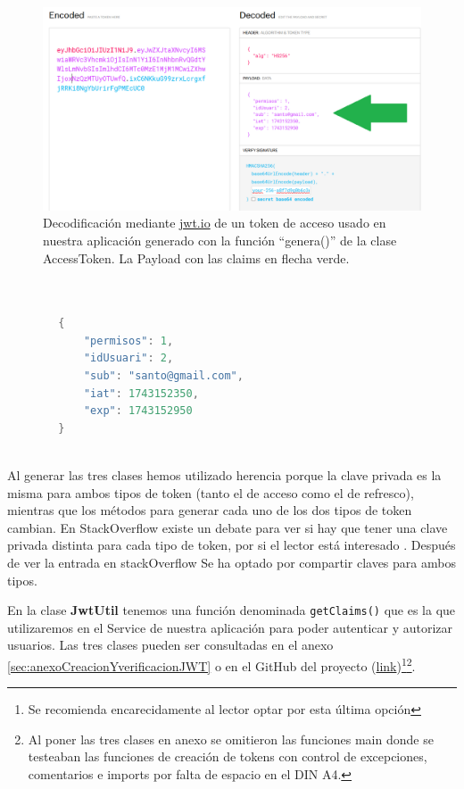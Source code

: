 \documentclass[a4paper,12pt]{report}
\begin{document}
	
			\setlength{\belowcaptionskip}{3pt}
			\FloatBarrier
			\begin{figure}[H]
				\centering
				\caption{Decodificación mediante \href{https://www.jwt.io}{jwt.io} de un token de acceso usado en nuestra aplicación generado con la función ``genera()'' de la clase AccessToken. La Payload con las claims en flecha verde.}
				\includegraphics[width=1\textwidth]{img/jwtio_mostra_payload.png}

				\label{fig:jwtioMostraPayload} 
			\end{figure}
			\FloatBarrier

		
\begin{lstlisting}[language=Java, basicstyle=\ttfamily\footnotesize, keywordstyle=\color{magenta}]
			
		
		{
		    "permisos": 1,
		    "idUsuari": 2,
		    "sub": "santo@gmail.com",
		    "iat": 1743152350,
		    "exp": 1743152950
		}
			
\end{lstlisting}
		
		
		
		
		
		Al generar las tres clases hemos utilizado herencia porque la clave privada es la misma para ambos tipos de token (tanto el de acceso como el de refresco), mientras que los métodos para generar cada uno de los dos tipos de token cambian. En StackOverflow existe un debate para ver si hay que tener una clave privada distinta para cada tipo de token, por si el lector está interesado \cite{stackoverflow_jwt_refresh_token_secret}. Después de ver la entrada en stackOverflow Se ha optado por compartir claves para ambos tipos.
		
		
		En la clase \textbf{JwtUtil} tenemos una función denominada \texttt{getClaims()} que es la que utilizaremos en el Service de nuestra aplicación para poder autenticar y autorizar usuarios. Las tres clases pueden ser consultadas en el anexo \ref{sec:anexoCreacionYverificacionJWT} o en el GitHub del proyecto (\href{https://github.com/blackcub3s/mercApp/blob/main/APP%20WEB/__springboot__produccio__/app/src/main/java/miApp/app/seguretat/jwt}{link})\footnote{Se recomienda encarecidamente al lector optar por esta última opción}\footnote{Al poner las tres clases en anexo se omitieron las funciones main donde se testeaban las funciones de creación de tokens con control de excepciones, comentarios e imports por falta de espacio en el DIN A4.}.
		
\end{document}
